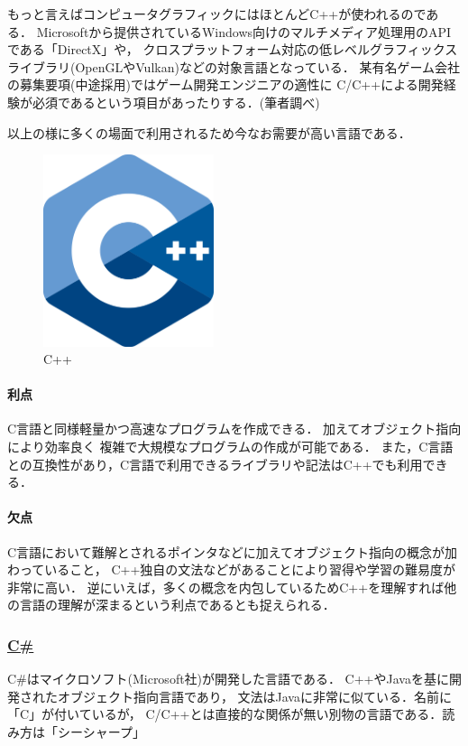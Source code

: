 \documentclass[autodetect-engine,dvi=dvipdfmx,ja=standard,a4j]{bxjsarticle}
\begin{document}
もっと言えばコンピュータグラフィックにはほとんどC++が使われるのである．
Microsoftから提供されているWindows向けのマルチメディア処理用のAPIである「DirectX」や，
クロスプラットフォーム対応の低レベルグラフィックスライブラリ(OpenGLやVulkan)などの対象言語となっている．
某有名ゲーム会社の募集要項(中途採用)ではゲーム開発エンジニアの適性に
C/C++による開発経験が必須であるという項目があったりする．(筆者調べ)

以上の様に多くの場面で利用されるため今なお需要が高い言語である．
\begin{figure}[H]
    \centering
    \includegraphics[width=50mm]{image/CPP.png}
    \caption*{C++}
    \label{fig:CPP}
\end{figure}

\paragraph*{利点}
C言語と同様軽量かつ高速なプログラムを作成できる．
加えてオブジェクト指向により効率良く
複雑で大規模なプログラムの作成が可能である．
また，C言語との互換性があり，C言語で利用できるライブラリや記法はC++でも利用できる．

\paragraph*{欠点}
C言語において難解とされるポインタなどに加えてオブジェクト指向の概念が加わっていること，
C++独自の文法などがあることにより習得や学習の難易度が非常に高い．
逆にいえば，多くの概念を内包しているためC++を理解すれば他の言語の理解が深まるという利点であるとも捉えられる．

\subsubsection*{\underline{\textbf{C\#}}}
C\#はマイクロソフト(Microsoft社)が開発した言語である．
C++やJavaを基に開発されたオブジェクト指向言語であり，
文法はJavaに非常に似ている．名前に「C」が付いているが，
C/C++とは直接的な関係が無い別物の言語である．読み方は「シーシャープ」
\end{document}
